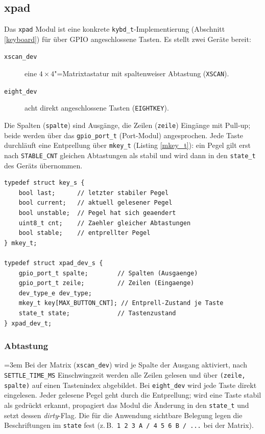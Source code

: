 \subsection{xpad}\label{xpad}
Das \verb|xpad| Modul ist eine konkrete \verb|kybd_t|-Implementierung
(Abschnitt \ref{keyboard}) für über GPIO angeschlossene Tasten. Es stellt
zwei Geräte bereit:
\begin{description}
\item[\texttt{xscan\_dev}] eine $4\times4$"=Matrixtastatur mit spaltenweiser
  Abtastung (\verb|XSCAN|).
\item[\texttt{eight\_dev}] acht direkt angeschlossene Tasten
  (\verb|EIGHTKEY|).
\end{description}
Die Spalten (\verb|spalte|) sind Ausgänge, die Zeilen (\verb|zeile|) Eingänge
mit Pull-up; beide werden über das \verb|gpio_port_t| (Port-Modul)
angesprochen. Jede Taste durchläuft eine Entprellung über \verb|mkey_t|
(Listing \ref{mkey_t}): ein Pegel gilt erst nach \verb|STABLE_CNT| gleichen
Abtastungen als stabil und wird dann in den \verb|state_t| des Geräts
übernommen.

\begin{listing}
\begin{verbatim}
typedef struct key_s {
    bool last;      // letzter stabiler Pegel
    bool current;   // aktuell gelesener Pegel
    bool unstable;  // Pegel hat sich geaendert
    uint8_t cnt;    // Zaehler gleicher Abtastungen
    bool stable;    // entprellter Pegel
} mkey_t;

typedef struct xpad_dev_s {
    gpio_port_t spalte;        // Spalten (Ausgaenge)
    gpio_port_t zeile;         // Zeilen (Eingaenge)
    dev_type_e dev_type;
    mkey_t key[MAX_BUTTON_CNT]; // Entprell-Zustand je Taste
    state_t state;             // Tastenzustand
} xpad_dev_t;
\end{verbatim}
\caption{Entprell- und Geräte-Struktur \texttt{mkey\_t} / \texttt{xpad\_dev\_t}}
\label{mkey_t}
\end{listing}

\subsubsection*{Abtastung}
{\sloppy\emergencystretch=3em
Bei der Matrix (\verb|xscan_dev|) wird je Spalte der Ausgang aktiviert, nach
\verb|SETTLE_TIME_MS| Einschwingzeit werden alle Zeilen gelesen und über
\verb|(zeile, spalte)| auf einen Tastenindex abgebildet. Bei \verb|eight_dev|
wird jede Taste direkt eingelesen. Jeder gelesene Pegel geht durch die
Entprellung; wird eine Taste stabil als gedrückt erkannt, propagiert das
Modul die Änderung in den \verb|state_t| und setzt dessen \emph{dirty}-Flag.
Die für die Anwendung sichtbare Belegung legen die Beschriftungen im
\verb|state| fest (z.\,B.\ \verb|1 2 3 A / 4 5 6 B / ...| bei der Matrix).
\par}

